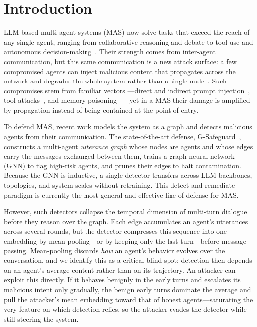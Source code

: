 \section{Introduction}
\label{sec:introduction}


LLM-based multi-agent systems (MAS) now solve tasks that exceed the reach of any
single agent, ranging from collaborative reasoning and debate to tool use and
autonomous decision-making~\citep{guo2024survey,li2023camel,zhuge2024gptswarm}.
Their strength comes from inter-agent communication, but this same communication
is a new attack surface: a few compromised agents can inject malicious content
that propagates across the network and degrades the whole system rather than a
single node~\citep{yu2024netsafe}. Such compromises stem from familiar vectors
---direct and indirect prompt injection~\citep{perez2022ignore,greshake2023indirect},
tool attacks~\citep{zhan2024injecagent}, and memory poisoning~\citep{chen2024agentpoison}---
yet in a MAS their damage is amplified by propagation instead of being contained
at the point of entry.

To defend MAS, recent work models the system as a graph and detects malicious
agents from their communication. The state-of-the-art defense,
G-Safeguard~\citep{wang2025gsafeguard}, constructs a multi-agent \emph{utterance
graph} whose nodes are agents and whose edges carry the messages exchanged
between them, trains a graph neural network (GNN) to flag high-risk agents, and
prunes their edges to halt contamination. Because the GNN is inductive, a single
detector transfers across LLM backbones, topologies, and system scales without
retraining. This detect-and-remediate paradigm is currently the most general and
effective line of defense for MAS.

However, such detectors collapse the temporal dimension of multi-turn dialogue
before they reason over the graph. Each edge accumulates an agent's utterances
across several rounds, but the detector compresses this sequence into one
embedding by mean-pooling---or by keeping only the last turn---before message
passing. Mean-pooling discards \emph{how} an agent's behavior evolves over the
conversation, and we identify this as a critical blind spot: detection then
depends on an agent's average content rather than on its trajectory. An attacker
can exploit this directly. If it behaves benignly in the early turns and escalates
its malicious intent only gradually, the benign early turns dominate the average
and pull the attacker's mean embedding toward that of honest agents---saturating
the very feature on which detection relies, so the attacker evades the detector
while still steering the system.

